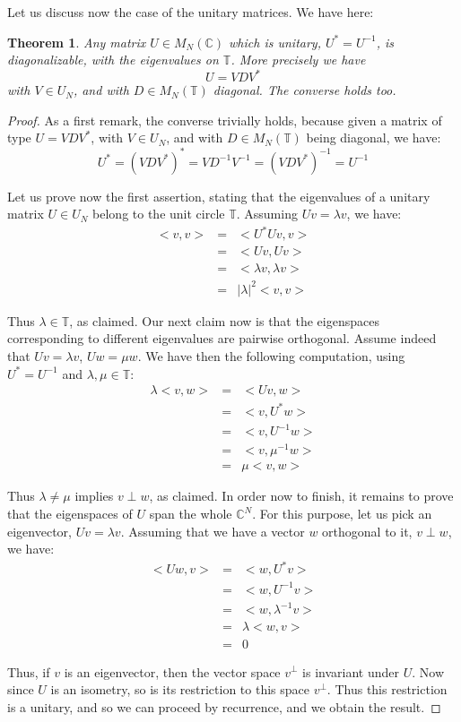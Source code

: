 \documentclass[12pt]{amsbook}
\newtheorem{theorem}{Theorem}[chapter]
\begin{document}
Let us discuss now the case of the unitary matrices. We have here:


\begin{theorem}
Any matrix $U\in M_N(\mathbb C)$ which is unitary, $U^*=U^{-1}$, is diagonalizable, with the eigenvalues on $\mathbb T$. More precisely we have
$$U=VDV^*$$
with $V\in U_N$, and with $D\in M_N(\mathbb T)$ diagonal. The converse holds too.
\end{theorem}

\begin{proof}
As a first remark, the converse trivially holds, because given a matrix of type $U=VDV^*$, with $V\in U_N$, and with $D\in M_N(\mathbb T)$ being diagonal, we have:
$$U^*
=(VDV^*)^*
=VD^{-1}V^{-1}
=(VDV^*)^{-1}
=U^{-1}$$

Let us prove now the first assertion, stating that the eigenvalues of a unitary matrix $U\in U_N$ belong to the unit circle $\mathbb T$. Assuming $Uv=\lambda v$, we have:
\begin{eqnarray*}
<v,v>
&=&<U^*Uv,v>\\
&=&<Uv,Uv>\\
&=&<\lambda v,\lambda v>\\
&=&|\lambda|^2<v,v>
\end{eqnarray*}

Thus $\lambda\in\mathbb T$, as claimed. Our next claim now is that the eigenspaces corresponding to different eigenvalues are pairwise orthogonal. Assume indeed that $Uv=\lambda v$, $Uw=\mu w$. We have then the following computation, using $U^*=U^{-1}$ and $\lambda,\mu\in\mathbb T$:
\begin{eqnarray*}
\lambda<v,w>
&=&<Uv,w>\\
&=&<v,U^*w>\\
&=&<v,U^{-1}w>\\
&=&<v,\mu^{-1}w>\\
&=&\mu<v,w>
\end{eqnarray*}

Thus $\lambda\neq\mu$ implies $v\perp w$, as claimed. In order now to finish, it remains to prove that the eigenspaces of $U$ span the whole $\mathbb C^N$. For this purpose, let us pick an eigenvector, $Uv=\lambda v$. Assuming that we have a vector $w$ orthogonal to it, $v\perp w$, we have:
\begin{eqnarray*}
<Uw,v>
&=&<w,U^*v>\\
&=&<w,U^{-1}v>\\
&=&<w,\lambda^{-1}v>\\
&=&\lambda<w,v>\\
&=&0
\end{eqnarray*}

Thus, if $v$ is an eigenvector, then the vector space $v^\perp$ is invariant under $U$. Now since $U$ is an isometry, so is its restriction to this space $v^\perp$. Thus this restriction is a unitary, and so we can proceed by recurrence, and we obtain the result.
\end{proof}
\end{document}
